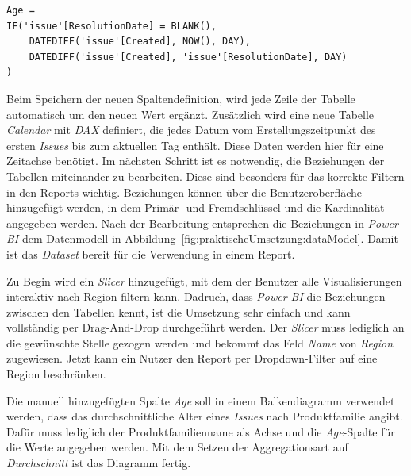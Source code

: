 \begin{lstlisting}[frame=single,caption=Code zur Defintion der Spalte \textit{Age} von Tabelle \textit{Issue},captionpos=b]
Age = 
IF('issue'[ResolutionDate] = BLANK(),
    DATEDIFF('issue'[Created], NOW(), DAY),   
    DATEDIFF('issue'[Created], 'issue'[ResolutionDate], DAY)
)
\end{lstlisting}

\noindent Beim Speichern der neuen Spaltendefinition, wird jede Zeile der Tabelle automatisch um den neuen Wert ergänzt. Zusätzlich wird eine neue Tabelle \textit{Calendar} mit \textit{DAX} definiert, die jedes Datum vom Erstellungszeitpunkt des ersten \textit{Issues} bis zum aktuellen Tag enthält. Diese Daten werden hier für eine Zeitachse benötigt. Im nächsten Schritt ist es notwendig, die Beziehungen der Tabellen miteinander zu bearbeiten. Diese sind besonders für das korrekte Filtern in den Reports wichtig. Beziehungen können über die Benutzeroberfläche hinzugefügt werden, in dem Primär- und Fremdschlüssel und die Kardinalität angegeben werden. Nach der Bearbeitung entsprechen die Beziehungen in \textit{Power BI} dem Datenmodell in Abbildung~\ref{fig:praktischeUmsetzung:dataModel}. Damit ist das \textit{Dataset} bereit für die Verwendung in einem Report.

Zu Begin wird ein \textit{Slicer} hinzugefügt, mit dem der Benutzer alle Visualisierungen interaktiv nach Region filtern kann. Dadruch, dass \textit{Power BI} die Beziehungen zwischen den Tabellen kennt, ist die Umsetzung sehr einfach und kann vollständig per Drag-And-Drop durchgeführt werden. Der \textit{Slicer} muss lediglich an die gewünschte Stelle gezogen werden und bekommt das Feld \textit{Name} von \textit{Region} zugewiesen. Jetzt kann ein Nutzer den Report per Dropdown-Filter auf eine Region beschränken.

Die manuell hinzugefügten Spalte \textit{Age} soll in einem Balkendiagramm verwendet werden, dass das durchschnittliche Alter eines \textit{Issues} nach Produktfamilie angibt. Dafür muss lediglich der Produktfamilienname als Achse und die \textit{Age}-Spalte für die Werte angegeben werden. Mit dem Setzen der Aggregationsart auf \textit{Durchschnitt} ist das Diagramm fertig.

